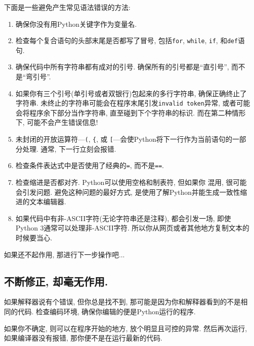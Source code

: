 \documentclass[10pt]{book}
\begin{document}
下面是一些避免产生常见语法错误的方法:

\begin{enumerate}

\item 确保你没有用Python关键字作为变量名. 

\item 检查每个复合语句的头部末尾是否都写了冒号, 包括{\tt for}, {\tt while},
{\tt if}, 和{\tt def}语句. 

\item 确保代码中所有字符串都有成对的引号. 确保所有的引号都是``直引号'', 而不是``弯引号''. 

\item 如果你有三个引号(单引号或者双银行)包起来的多行字符串, 确保正确终止了字符串. 
未终止的字符串可能会在程序末尾引发{\tt invalid token}异常, 
或者可能会将程序余下部分当作字符串, 直至碰到下个字符串的标识. 
而在第二种情形下, 可能不会产生错误信息!

\item 未封闭的开放运算符---\verb+(+, \verb+{+, 或
\verb+[+---会使Python将下一行作为当前语句的一部分处理. 
通常, 下一行立刻会报错. 

\item 检查条件表达式中是否使用了经典的{\tt =}, 而不是{\tt ==}.

\item 检查缩进是否都对齐. Python可以使用空格和制表符, 但如果你
混用, 很可能会引发问题. 
避免这种问题的最好方式, 是使用了解Python并能生成一致性缩进的文本编辑器. 

\item 如果代码中有非-ASCII字符(无论字符串还是注释), 都会引发一场, 
即使Python 3通常可以处理非-ASCII字符. 
所以你从网页或者其他地方复制文本的时候要当心. 

\end{enumerate}

如果还不起作用, 那进行下一步操作吧...


\subsection{不断修正, 却毫无作用.}

如果解释器说有个错误, 但你总是找不到, 
那可能是因为你和解释器看到的不是相同的代码. 
检查编码环境, 确保你编辑的便是Python运行的程序. 

如果你不确定, 则可以在程序开始的地方, 放个明显且可控的异常. 
然后再次运行, 如果编译器没有报错, 那你便不是在运行最新的代码. 
\end{document}
